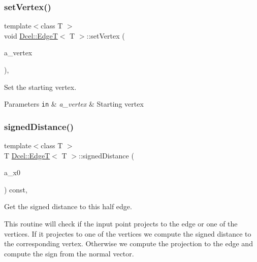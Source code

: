 \subsubsection{\texorpdfstring{set\+Vertex()}{setVertex()}}
{\footnotesize\ttfamily template$<$class T $>$ \\
void \hyperlink{classDcel_1_1EdgeT}{Dcel\+::\+EdgeT}$<$ T $>$\+::set\+Vertex (\begin{DoxyParamCaption}\item[{const \hyperlink{classDcel_1_1EdgeT_ab4ba57cfc6b2f90da43096eea87bb284}{Vertex\+Ptr} \&}]{a\+\_\+vertex }\end{DoxyParamCaption})\hspace{0.3cm}{\ttfamily [inline]}, {\ttfamily [noexcept]}}



Set the starting vertex. 


\begin{DoxyParams}[1]{Parameters}
\mbox{\tt in}  & {\em a\+\_\+vertex} & Starting vertex \\
\hline
\end{DoxyParams}
\mbox{\label{classDcel_1_1EdgeT_adba2d72aed5f510997d06c2bc9e6e96c}} 
\subsubsection{\texorpdfstring{signed\+Distance()}{signedDistance()}}
{\footnotesize\ttfamily template$<$class T $>$ \\
T \hyperlink{classDcel_1_1EdgeT}{Dcel\+::\+EdgeT}$<$ T $>$\+::signed\+Distance (\begin{DoxyParamCaption}\item[{const \hyperlink{classDcel_1_1EdgeT_a93b8679cea557c419af44385ca6d356a}{Vec3} \&}]{a\+\_\+x0 }\end{DoxyParamCaption}) const\hspace{0.3cm}{\ttfamily [inline]}, {\ttfamily [noexcept]}}



Get the signed distance to this half edge. 

This routine will check if the input point projects to the edge or one of the vertices. If it projectes to one of the vertices we compute the signed distance to the corresponding vertex. Otherwise we compute the projection to the edge and compute the sign from the normal vector. \mbox{\label{classDcel_1_1EdgeT_a50345997f00af679875fda510b3e0607}} 
